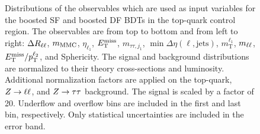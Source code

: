 \begin{figure}[htb]
\begin{subfigure}[t]{0.3\textwidth}
    \end{subfigure}
    \caption{Distributions of the observables which are used as input variables for the boosted SF and boosted DF BDTs in the top-quark control region.
             The observables are from top to bottom and from left to right: $\Delta R_{\ell\ell}$, $m_\text{MMC}$, $\eta_{\ell_1}$, $E_\text{T}^\text{miss}$, $m_{\tau\tau,j_{1}}$,
             $\min \Delta \eta (\ell, \text{jets})$, $m_\text{T}^{\ell_1}$, $m_{\ell\ell}$, $E_\text{T}^\text{miss} / p_\text{T}^{\ell_2}$, and Sphericity.
             The signal and background distributions are normalized to their theory cross-sections and luminosity.
             Additional normalization factors are applied on the top-quark, $Z \to \ell \ell$, and $Z \to \tau \tau$ background.
             The signal is scaled by a factor of 20.
             Underflow and overflow bins are included in the first and last bin, respectively.
             Only statistical uncertainties are included in the error band.}\label{fig:mva:modeling:cr:boosttop}
\end{figure}

